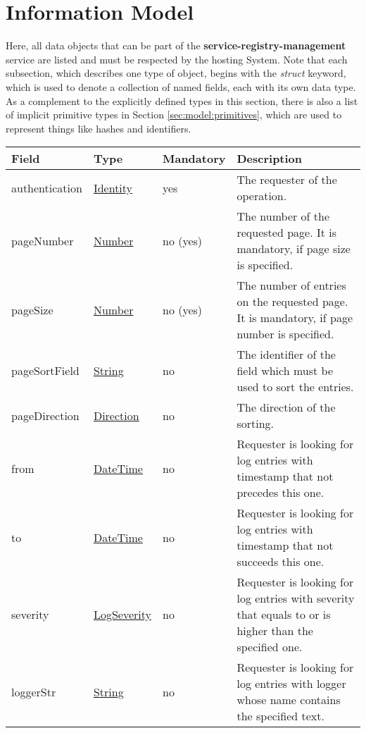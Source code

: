 \documentclass[a4paper]{arrowhead}
\newcommand{\pref}[1]{{\textcolor{ArrowheadGrey}{\hyperref[sec:model:primitives:#1]{#1}}}}
\begin{document}

\clearpage

\section{Information Model}
\label{sec:model}

Here, all data objects that can be part of the \textbf{service-registry-management} service
are listed and must be respected by the hosting System.
Note that each subsection, which describes one type of object, begins with the \textit{struct} keyword, which is used to denote a collection of named fields, each with its own data type.
As a complement to the explicitly defined types in this section, there is also a list of implicit primitive types in Section \ref{sec:model:primitives}, which are used to represent things like hashes and identifiers.

\label{sec:model:LogRequest}
 
\begin{table}[ht!]
\begin{tabularx}{\textwidth}{| p{2.5cm} | p{2.5cm} | p{2cm} | X |} \hline
\rowcolor{gray!33} Field & Type & Mandatory & Description \\ \hline
authentication & \hyperref[sec:model:Identity]{Identity} & yes & The requester of the operation. \\ \hline
pageNumber & \pref{Number} & no (yes) & The number of the requested page. It is mandatory, if page size is specified. \\ \hline
pageSize & \pref{Number} & no (yes) & The number of entries on the requested page. It is mandatory, if page number is specified. \\ \hline
pageSortField & \pref{String} & no & The identifier of the field which must be used to sort the entries. \\ \hline
pageDirection & \pref{Direction} & no & The direction of the sorting. \\ \hline
from & \pref{DateTime} & no & Requester is looking for log entries with timestamp that not precedes this one. \\ \hline
to & \pref{DateTime} & no & Requester is looking for log entries with timestamp that not succeeds this one. \\ \hline
severity & \pref{LogSeverity} & no & Requester is looking for log entries with severity that equals to or is higher than the specified one. \\ \hline
loggerStr &  \pref{String} & no & Requester is looking for log entries with logger whose name contains the specified text. \\ \hline
\end{tabularx}
\end{table}
\end{document}
